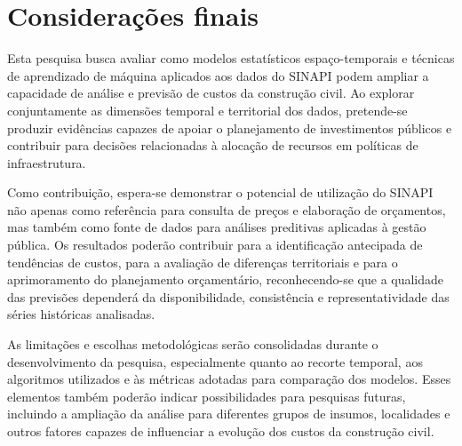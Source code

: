 
\section{Considerações finais}

Esta pesquisa busca avaliar como modelos estatísticos espaço-temporais e técnicas de 
aprendizado de máquina aplicados aos dados do SINAPI podem ampliar a capacidade de 
análise e previsão de custos da construção civil. Ao explorar conjuntamente as dimensões 
temporal e territorial dos dados, pretende-se produzir evidências capazes de apoiar o 
planejamento de investimentos públicos e contribuir para decisões relacionadas à alocação 
de recursos em políticas de infraestrutura.

Como contribuição, espera-se demonstrar o potencial de utilização do SINAPI não apenas como 
referência para consulta de preços e elaboração de orçamentos, mas também como fonte de dados 
para análises preditivas aplicadas à gestão pública. Os resultados poderão contribuir para a 
identificação antecipada de tendências de custos, para a avaliação de diferenças territoriais
e para o aprimoramento do planejamento orçamentário, reconhecendo-se que a qualidade das 
previsões dependerá da disponibilidade, consistência e representatividade das séries históricas 
analisadas. 

As limitações e escolhas metodológicas serão consolidadas durante o desenvolvimento 
da pesquisa, especialmente quanto ao recorte temporal, aos algoritmos utilizados e às métricas 
adotadas para comparação dos modelos. Esses elementos também poderão indicar possibilidades 
para pesquisas futuras, incluindo a ampliação da análise para diferentes grupos de insumos, 
localidades e outros fatores capazes de influenciar a evolução dos custos da construção civil.
